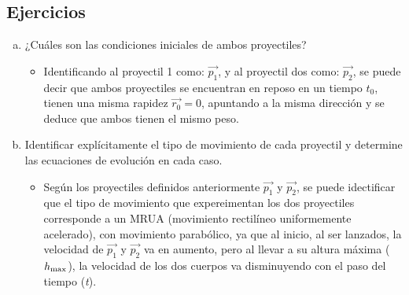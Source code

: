 \documentclass[12pt,tikz,border=3.14mm]{article}
\begin{document}
	\subsection*{Ejercicios}
		\begin{enumerate}[a),leftmargin=1cm]
			\item ¿Cuáles son las condiciones iniciales de ambos proyectiles?
				\begin{itemize}
					\item Identificando al proyectil 1 como: $\vec{p_1}$, y al proyectil dos como: $\vec{p_2}$, se puede decir que ambos proyectiles se encuentran en reposo en un tiempo $t_0$, tienen una misma rapidez $\vec{r_0} = 0$, apuntando a la misma dirección y se deduce que ambos tienen el mismo peso.
				\end{itemize}
			\item Identificar explícitamente el tipo de movimiento de cada proyectil y determine las ecuaciones de evolución en cada caso.
				\begin{itemize}
					\item Según los proyectiles definidos anteriormente $\vec{p_1}$ y $\vec{p_2}$, se puede idectificar que el tipo de movimiento que expereimentan los dos proyectiles corresponde a un MRUA (movimiento rectilíneo uniformemente acelerado), con movimiento parabólico, ya que al inicio, al ser lanzados, la velocidad de $\vec{p_1}$ y $\vec{p_2}$ va en aumento, pero al llevar a su altura máxima ($h_{\rm{max}}$), la velocidad de los dos cuerpos va disminuyendo con el paso del tiempo (\emph{t}).
					

\end{itemize}
\end{enumerate}
\end{document}
